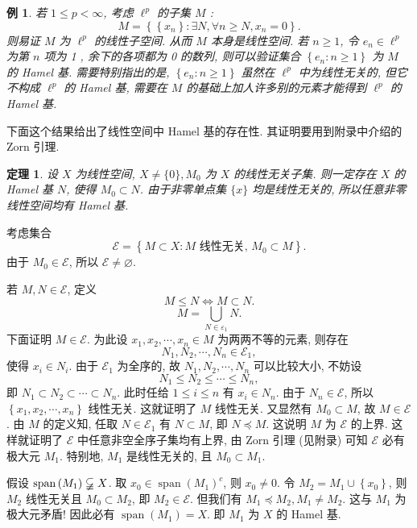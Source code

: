 \documentclass[openany]{ctexbook}
\makeatletter
\theoremstyle{kaiti}
\newtheorem{theorem}{定理}[section]
\theoremstyle{normal}
\newtheorem{example}{例}[section]
\renewenvironment{proof}[1][\proofname]{\par
    \pushQED{\qed}%
    \normalfont \topsep6\p@\@plus6\p@\relax
    \trivlist
    \item\relax
    {\heiti #1}\hspace{2\labelsep}\ignorespaces
  }{%
    \popQED\endtrivlist\@endpefalse
  }
\makeatother
\begin{document}
\begin{example}
若 $1 \leqslant p<\infty$, 考虑 $\ell^{p}$ 的子集 $M$ :
$$
M=\left\{\left\{x_n\right\}: \exists N, \forall n \geqslant N, x_n=0\right\}.
$$
则易证 $M$ 为 $\ell^{p}$ 的线性子空间. 从而 $M$ 本身是线性空间. 若 $n \geqslant 1$, 令 $e_n \in \ell^{p}$ 为第 $n$ 项为 1 , 余下的各项都为 0 的数列, 则可以验证集合 $\left\{e_n: n \geqslant 1\right\}$ 为 $M$ 的 Hamel 基. 需要特别指出的是, $\left\{e_n: n \geqslant 1\right\}$ 虽然在 $\ell^{p}$ 中为线性无关的, 但它不构成 $\ell^{p}$ 的 Hamel 基, 需要在 $M$ 的基础上加人许多别的元素才能得到 $\ell^{p}$ 的 Hamel 基.
\end{example}

下面这个结果给出了线性空间中 Hamel 基的存在性. 其证明要用到附录中介绍的 Zorn 引理.

\begin{theorem}
设 $X$ 为线性空间, $X \neq\{0\}, M_0$ 为 $X$ 的线性无关子集. 则一定存在 $X$ 的 Hamel 基 $N$, 使得 $M_0 \subset N$. 由于非零单点集 $\{x\}$ 均是线性无关的, 所以任意非零线性空间均有 Hamel 基.
\end{theorem}

\begin{proof}
考虑集合
$$
\mathcal{E}=\left\{M \subset X: M \text { 线性无关, } M_0 \subset M\right\}.
$$
由于 $M_0 \in \mathcal{E}$, 所以 $\mathcal{E} \neq \varnothing$.

若 $M, N \in \mathcal{E}$, 定义
$$
M \leqslant N \Leftrightarrow M \subset N.
$$
$$
M=\bigcup_{N \in \varepsilon_1} N.
$$
下面证明 $M \in \mathcal{E}$. 为此设 $x_1, x_2, \cdots, x_n \in M$ 为两两不等的元素, 则存在
$$
N_1, N_2, \cdots, N_n \in \mathcal{E}_1,
$$
使得 $x_{i} \in N_{i}$. 由于 $\mathcal{E}_1$ 为全序的, 故 $N_1, N_2, \cdots, N_n$ 可以比较大小, 不妨设
$$
N_1 \leqslant N_2 \leqslant \cdots \leqslant N_n,
$$
即 $N_1 \subset N_2 \subset \cdots \subset N_n$. 此时任给 $1 \leqslant i \leqslant n$ 有 $x_{i} \in N_n$. 由于 $N_n \in \mathcal{E}$, 所以 $\left\{x_1, x_2, \cdots, x_n\right\}$ 线性无关. 这就证明了 $M$ 线性无关. 又显然有 $M_0 \subset M$, 故 $M \in \mathcal{E}$. 由 $M$ 的定义知, 任取 $N \in \mathcal{E}_1$ 有 $N \subset M$, 即 $N \preccurlyeq M$. 这说明 $M$ 为 $\mathcal{E}$ 的上界. 这样就证明了 $\mathcal{E}$ 中任意非空全序子集均有上界, 由 Zorn 引理 (见附录) 可知 $\mathcal{E}$ 必有极大元 $M_1$. 特别地, $M_1$ 是线性无关的, 且 $M_0 \subset M_1$.

假设 $\operatorname{span}\left(M_1\right) \varsubsetneqq X$. 取 $x_0 \in \operatorname{span}\left(M_1\right)^{c}$, 则 $x_0 \neq 0$. 令 $M_2=M_1 \cup\left\{x_0\right\}$, 则 $M_2$ 线性无关且 $M_0 \subset M_2$, 即 $M_2 \in \mathcal{E}$. 但我们有 $M_1 \preccurlyeq M_2, M_1 \neq M_2$. 这与 $M_1$ 为极大元矛盾! 因此必有 $\operatorname{span}\left(M_1\right)=X$. 即 $M_1$ 为 $X$ 的 Hamel 基.
\end{proof}
\end{document}
